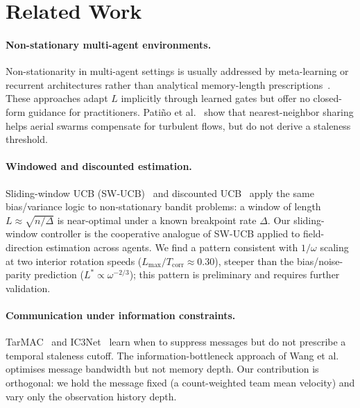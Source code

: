 \documentclass[sigconf,anonymous]{aamas}
\newcommand{\Lmax}{L_{\max}}
\newcommand{\Tcorr}{T_{\mathrm{corr}}}
\begin{document}
\section{Related Work}
\label{sec:related}

\paragraph{Non-stationary multi-agent environments.}
Non-stationarity in multi-agent settings is usually addressed by
meta-learning or recurrent architectures rather than analytical
memory-length prescriptions~\cite{foerster2018dial,kapturowski2019r2d2}.
These approaches adapt $L$ implicitly through learned gates but
offer no closed-form guidance for practitioners.
Pati\~{n}o et al.~\cite{patino2023turbulent} show that nearest-neighbor
sharing helps aerial swarms compensate for turbulent flows, but
do not derive a staleness threshold.

\paragraph{Windowed and discounted estimation.}
Sliding-window UCB (SW-UCB)~\cite{garivier2011swucb} and
discounted UCB~\cite{kocsis2006discucb} apply the same
bias/variance logic to non-stationary bandit problems:
a window of length $L \approx \sqrt{n/\Delta}$ is near-optimal
under a known breakpoint rate $\Delta$. Our sliding-window controller
is the cooperative analogue of SW-UCB applied to field-direction
estimation across agents. We find a pattern consistent with $1/\omega$ scaling
at two interior rotation speeds ($\Lmax/\Tcorr \approx 0.30$),
steeper than the bias/noise-parity prediction ($L^* \propto \omega^{-2/3}$);
this pattern is preliminary and requires further validation.

\paragraph{Communication under information constraints.}
TarMAC~\cite{das2019tarmac} and IC3Net~\cite{singh2019ic3net}
learn when to suppress messages but do not prescribe a temporal
staleness cutoff. The information-bottleneck approach of
Wang et al.~\cite{wang2020ib} optimises message bandwidth but
not memory depth. Our contribution is orthogonal: we hold the
message fixed (a count-weighted team mean velocity) and vary
only the observation history depth.
\end{document}
